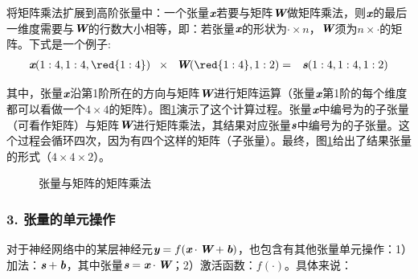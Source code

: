 \parinterval 将矩阵乘法扩展到高阶张量中：一个张量${\textbf{\em x}}$若要与矩阵$ {\textbf{\em W}}$做矩阵乘法，则$ {\textbf{\em x}} $的最后一维度需要与${\textbf{\em W}}$的行数大小相等，即：若张量${\textbf{\em x}} $的形状为$ \cdot \times n $，${\textbf{\em W}} $须为$ n\times \cdot $的矩阵。下式是一个例子:
\begin{eqnarray}
{\mathbi{x}}(1:4,1:4,{\red{1:4}})\;\;\times\;\; {{\mathbi{W}}({\red{1:4}},1:2)}&=&{\mathbi{s}}(1:4,1:4,1:2)
\label{eq:9-25}
\end{eqnarray}

\noindent 其中，张量${\textbf{\em x}} $沿第1阶所在的方向与矩阵$ {\textbf{\em W}}$进行矩阵运算（张量${\textbf{\em x}}$第1阶的每个维度都可以看做一个$ 4\times 4 $的矩阵）。图\ref{fig:9-27}演示了这个计算过程。张量${\textbf{\em x}}$中编号为的子张量（可看作矩阵）与矩阵${\textbf{\em W}}$进行矩阵乘法，其结果对应张量$ {\textbf{\em s}}$中编号为的子张量。这个过程会循环四次，因为有四个这样的矩阵（子张量）。最终，图\ref{fig:9-27}给出了结果张量的形式（$ 4 \times 4 \times 2 $）。

\begin{figure}[htp]
\centering

\caption{张量与矩阵的矩阵乘法}
\label{fig:9-27}
\end {figure}

\subsubsection{3. 张量的单元操作}
\vspace{0.5em}

\parinterval 对于神经网络中的某层神经元$ {\textbf{\em y}}=f({\textbf{\em x}}\cdot {\textbf{\em W}}+{\textbf{\em b}}) $，也包含有其他张量单元操作：1）加法：$ {\textbf{\em s}}+{\textbf{\em b}}$，其中张量$ {\textbf{\em s}}={\textbf{\em x}}\cdot {\textbf{\em W}} $；2）激活函数：$ f(\cdot) $。具体来说：

